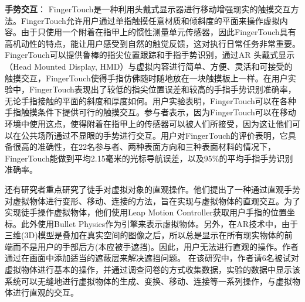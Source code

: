 


\textbf{手势交互}：
FingerTouch\cite{OhParPar20}是一种利用头戴式显示器进行移动增强现实的触摸交互方法。FingerTouch允许用户通过单指触摸任意材质和倾斜度的平面来操作虚拟内容。由于只使用一个附着在指甲上的惯性测量单元传感器，因此FingerTouch具有高机动性的特点，能让用户感受到自然的触觉反馈，这对执行日常任务非常重要。
FingerTouch可以提供鲁棒的指尖位置跟踪和手指手势识别，通过AR 头戴式显示（Head Mounted Display, HMD）与虚拟内容进行简单、方便、灵活和可接受的触摸交互，FingerTouch使得手指仿佛随时随地放在一块触摸板上一样。在用户实验中，FingerTouch表现出了较低的指尖位置误差和较高的手指手势识别准确率，无论手指接触的平面的斜度和厚度如何。用户实验表明，FingerTouch可以在各种手指触摸条件下提供可行的触摸交互。参与者表示，因为FingerTouch可以在移动环境中使用这点，使得附着在指甲上的传感器可以被人们所接受，因为这让他们可以在公共场所通过不显眼的手势进行交互。用户对FingerTouch的评价表明，它具备很高的准确性，在22名参与者、两种表面方向和三种表面材料的情况下，FingerTouch能做到平均2.15毫米的光标导航误差，以及95\%的平均手指手势识别准确率。

还有研究者\cite{SakIshHor20}重点研究了徒手对虚拟对象的直观操作。他们提出了一种通过直观手势对虚拟物体进行变形、移动、连接的方法，旨在实现与虚拟物体的直观交互。为了实现徒手操作虚拟物体，他们使用Leap Motion Controller\cite{ultraleap}获取用户手指的位置坐标。此外使用Bullet Physics\cite{BulletPhysics}作为引擎来表示虚拟物体。另外，在AR技术中，由于三维(3D)模型是叠加在真实空间的图像之后，所以总是显示在所有现实物体的前端而不是用户的手部后方(本应被手遮挡)。因此，用户无法进行直观的操作。作者通过在画面中添加适当的遮蔽层来解决遮挡问题。
在该研究中，作者请6名被试对虚拟物体进行基本的操作，并通过调查问卷的方式收集数据，实验的数据中显示该系统可以无缝地进行虚拟物体的生成、变换、移动、连接等一系列操作，与虚拟物体进行直观的交互。

